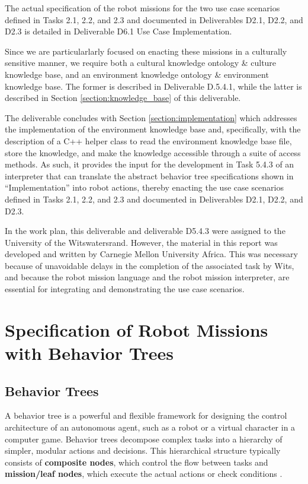 \documentclass{CSSRforAfrica}
\begin{document}
The actual specification of the robot missions for the two use case scenarios defined in Tasks 2.1, 2.2, and 2.3 and documented in  Deliverables D2.1, D2.2, and D2.3 is detailed in Deliverable D6.1 Use Case Implementation.

Since we are particularlarly focused on enacting these missions in a culturally sensitive manner, we require both a cultural knowledge ontology \&  culture knowledge base,  and an environment knowledge ontology \& environment knowledge  base.
The former is described in Deliverable D.5.4.1, while the latter is described in Section \ref{section:knowledge_base} of this deliverable. 

The deliverable concludes with Section \ref{section:implementation} which addresses the implementation of the environment knowledge base and, specifically, with the description of a C++ helper class  to read the environment knowledge base file, store the knowledge, and make the knowledge accessible through a suite of access methods.  As such, it  provides the input for the development in Task 5.4.3 of an interpreter that can translate the  abstract behavior tree specifications shown in ``Implementation'' into robot actions, thereby  enacting the use case scenarios defined in Tasks 2.1, 2.2, and 2.3 and documented in  Deliverables D2.1, D2.2, and D2.3.  

In the work plan, this deliverable and deliverable D5.4.3 were assigned to the University of the Witswatersrand. However, the material in this report was developed and written by Carnegie Mellon University Africa. This was necessary because of unavoidable delays in the completion of the associated task by Wits, and because the robot mission language and the robot mission interpreter, are essential for integrating and demonstrating the use case scenarios. 


\section {Specification of Robot Missions with Behavior Trees} %
\label{section:specification}

\subsection{Behavior Trees}
\label{section:overview}
A behavior tree is a powerful and flexible framework for designing the control architecture of an autonomous agent, such as a robot or a virtual character in a computer game. Behavior trees decompose complex tasks into a hierarchy of simpler, modular actions and decisions. This hierarchical structure typically consists of \textbf{composite nodes}, which control the flow between tasks and \textbf{mission/leaf nodes}, which execute the actual actions or check conditions \cite{Ghzoulietal2023,DortmansPunter2022}.
\end{document}
